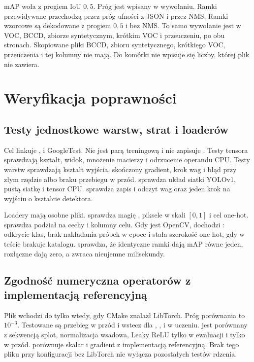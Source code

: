 mAP woła  z progiem IoU \(0{,}5\). Próg jest wpisany w wywołaniu. Ramki przewidywane przechodzą przez próg ufności z JSON i przez NMS. Ramki wzorcowe są dekodowane z progiem \(0{,}5\) i bez NMS. To samo wywołanie jest w VOC, BCCD, zbiorze syntetycznym, krótkim VOC i przeuczeniu, po obu stronach. Skopiowane pliki BCCD, zbioru syntetycznego, krótkiego VOC, przeuczenia i  tej kolumny nie mają. Do komórki nie wpisuje się liczby, której plik nie zawiera.

\section{Weryfikacja poprawności}

\subsection{Testy jednostkowe warstw, strat i loaderów}

Cel  linkuje ,  i GoogleTest. Nie jest parą treningową i nie zapisuje . Testy tensora sprawdzają kształt, widok, mnożenie macierzy i odrzucenie operandu CPU. Testy warstw sprawdzają kształt wyjścia, skończony gradient, krok wag i błąd przy złym rzędzie albo braku przebiegu w przód.  sprawdza układ siatki YOLOv1, pustą siatkę i tensor CPU.  sprawdza zapis i odczyt wag oraz jeden krok  na wyjściu o kształcie detektora.

Loadery mają osobne pliki.  sprawdza magię , piksele w skali \([0,1]\) i cel one-hot.  sprawdza podział na cechy i kolumny celu. Gdy jest OpenCV, dochodzi : odkrycie klas, brak nakładania próbek w epoce i stała szerokość one-hot, gdy w teście brakuje katalogu.  sprawdza, że identyczne ramki dają mAP równe jeden, rozłączne dają zero, a  zwraca nieujemne milisekundy.

\subsection{Zgodność numeryczna operatorów z implementacją referencyjną}

Plik  wchodzi do  tylko wtedy, gdy CMake znalazł LibTorch. Próg porównania to \(10^{-3}\). Testowane są przebieg w przód i wstecz dla , ,  i  w uczeniu.  jest porównany z sekwencją splot, normalizacja wsadowa, Leaky ReLU tylko w ewaluacji i tylko w przód.  porównuje skalar i gradient z implementacją referencyjną. Brak tego pliku przy konfiguracji bez LibTorch nie wyłącza pozostałych testów rdzenia.


